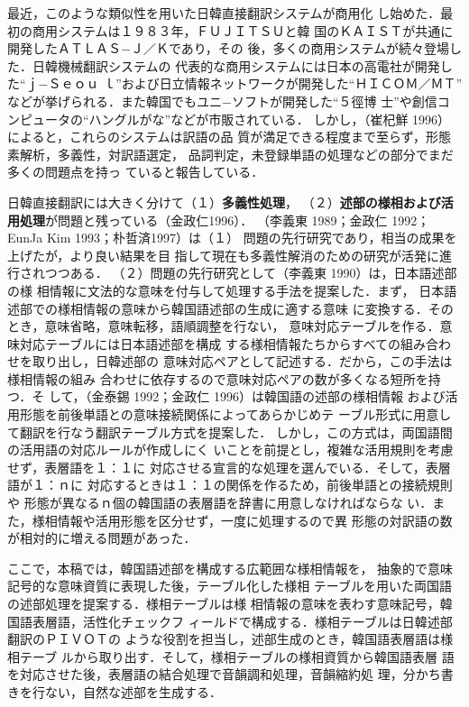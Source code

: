 最近，このような類似性を用いた日韓直接翻訳システムが商用化
し始めた．最初の商用システムは１９８３年，ＦＵＪＩＴＳＵと韓
国のＫＡＩＳＴが共通に開発したＡＴＬＡＳ−Ｊ／Ｋであり，その
後，多くの商用システムが続々登場した．日韓機械翻訳システムの
代表的な商用システムには日本の高電社が開発した“ｊ−Ｓｅｏｕ
ｌ”および日立情報ネットワークが開発した“ＨＩＣＯＭ／ＭＴ”
などが挙げられる．また韓国でもユニ−ソフトが開発した“５徑博
士”や創信コンピュータの“ハングルがな”などが市販されている．
しかし，（崔杞鮮 1996）によると，これらのシステムは訳語の品
質が満足できる程度まで至らず，形態素解析，多義性，対訳語選定，
品詞判定，未登録単語の処理などの部分でまだ多くの問題点を持っ
ていると報告している．

日韓直接翻訳には大きく分けて（１）{\bf 多義性処理}，
（２）{\bf 述部の様相および活用処理}が問題と残っている（金政仁1996）．
（李義東 1989；金政仁 1992；EunJa Kim 1993；朴哲済1997）は（１）
問題の先行研究であり，相当の成果を上げたが，より良い結果を目
指して現在も多義性解消のための研究が活発に進行されつつある．
（２）問題の先行研究として（李義東 1990）は，日本語述部の様
相情報に文法的な意味を付与して処理する手法を提案した．まず，
日本語述部での様相情報の意味から韓国語述部の生成に適する意味
に変換する．そのとき，意味省略，意味転移，語順調整を行ない，
意味対応テーブルを作る．意味対応テーブルには日本語述部を構成
する様相情報たちからすべての組み合わせを取り出し，日韓述部の
意味対応ペアとして記述する．だから，この手法は様相情報の組み
合わせに依存するので意味対応ペアの数が多くなる短所を持つ．そ
して，（金泰錫 1992；金政仁 1996）は韓国語の述部の様相情報
および活用形態を前後単語との意味接続関係によってあらかじめテ
ーブル形式に用意して翻訳を行なう翻訳テーブル方式を提案した．
しかし，この方式は，両国語間の活用語の対応ルールが作成しにく
いことを前提とし，複雑な活用規則を考慮せず，表層語を１：１に
対応させる宣言的な処理を選んでいる．そして，表層語が１：ｎに
対応するときは１：１の関係を作るため，前後単語との接続規則や
形態が異なるｎ個の韓国語の表層語を辞書に用意しなければならな
い．また，様相情報や活用形態を区分せず，一度に処理するので異
形態の対訳語の数が相対的に増える問題があった．

ここで，本稿では，韓国語述部を構成する広範囲な様相情報を，
抽象的で意味記号的な意味資質に表現した後，テーブル化した様相
テーブルを用いた両国語の述部処理を提案する．様相テーブルは様
相情報の意味を表わす意味記号，韓国語表層語，活性化チェックフ
ィールドで構成する．様相テーブルは日韓述部翻訳のＰＩＶＯＴの
ような役割を担当し，述部生成のとき，韓国語表層語は様相テーブ
ルから取り出す．そして，様相テーブルの様相資質から韓国語表層
語を対応させた後，表層語の結合処理で音韻調和処理，音韻縮約処
理，分かち書きを行ない，自然な述部を生成する．

